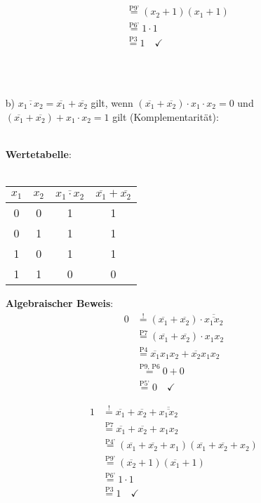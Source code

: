\documentclass{article}
\newcommand{\nyet}{\overline}
\begin{document}
\begin{enumerate}
\begin{minipage}[t]{0.3\textwidth}
\begin{align*}
				&\stackrel{\text{P9'}}{=} (x_2 + 1)(x_1 + 1) \\
				&\stackrel{\text{P6'}}{=} 1\cdot 1 \\
				&\stackrel{\text{P3}}{=} 1 \quad \checkmark
			\end{align*}
		\end{minipage}\\\\
		\item[b)] $\overline{x_1 \cdot x_2} = \overline{x_1} + \overline{x_2}$ gilt, wenn $(\overline{x_1} + \overline{x_2}) \cdot x_1 \cdot x_2 = 0$ und $(\overline{x_1} + \overline{x_2}) + x_1 \cdot x_2 = 1$ gilt (Komplementarität): \\\\
		\begin{minipage}[t]{0.27\textwidth}
			\textbf{Wertetabelle}:\\\\
			\begin{tabular}[t]{cc|cc}
				$x_1$ & $x_2$ & $\nyet{x_1 \cdot x_2}$ & $ \nyet{x_1} + \nyet{x_2}$ \\ \hline
				0 & 0 & 1 & 1 \\
				0 & 1 & 1 & 1 \\
				1 & 0 & 1 & 1 \\
				1 & 1 & 0 & 0
			\end{tabular}
		\end{minipage}
		\begin{minipage}[t]{0.35\textwidth}
			\textbf{Algebraischer Beweis}:
			\begin{align*}
				0 &\stackrel{!}{=} (\nyet{x_1} + \nyet{x_2}) \cdot \nyet{\nyet{x_1 x_2}}  \\
				&\stackrel{\text{P7}}{=} (\nyet{x_1} + \nyet{x_2}) \cdot x_1 x_2 \\
				&\stackrel{\text{P4}}{=} \nyet{x_1} x_1 x_2 + \nyet{x_2} x_1 x_2 \\
				&\stackrel{\text{P9, P6}}{=} 0 + 0 \\
				&\stackrel{\text{P5'}}{=} 0 \quad \checkmark
			\end{align*}
		\end{minipage}
		\begin{minipage}[t]{0.3\textwidth}
			\vspace{0.3em}
			\begin{align*}
				1 &\stackrel{!}{=} \nyet{x_1} + \nyet{x_2} + \nyet{\nyet{x_1 x_2}} \\
				&\stackrel{\text{P7}}{=} \nyet{x_1} + \nyet{x_2} + x_1 x_2 \\
				&\stackrel{\text{P4'}}{=} (\nyet{x_1} + \nyet{x_2} + x_1)(\nyet{x_1} + \nyet{x_2} + x_2) \\
				&\stackrel{\text{P9'}}{=} (\nyet{x_2} + 1)(\nyet{x_1} + 1) \\
				&\stackrel{\text{P6'}}{=} 1\cdot 1 \\
				&\stackrel{\text{P3}}{=} 1 \quad \checkmark
			\end{align*}
		\end{minipage}
	\end{enumerate}
\end{document}
